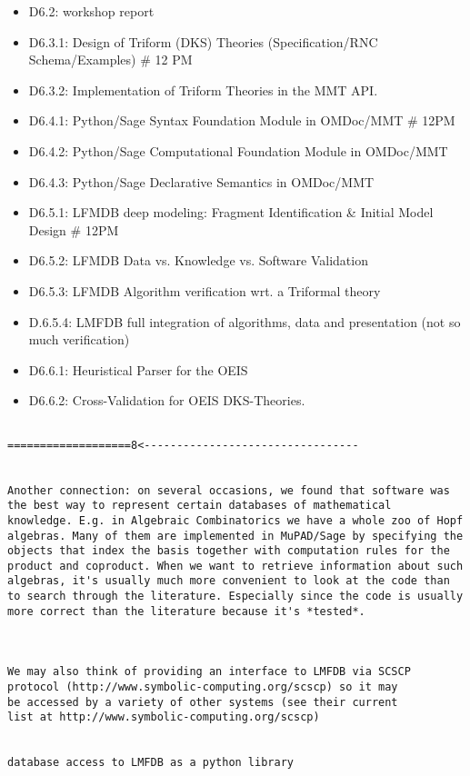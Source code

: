 \begin{Workpackage}{\thewpno}
\begin{WPDeliverables}
\begin{itemize}
\item D6.2: workshop report
\item D6.3.1: Design of Triform (DKS) Theories (Specification/RNC Schema/Examples)          # 12 PM
\item D6.3.2: Implementation of Triform Theories in the MMT API. 

\item D6.4.1: Python/Sage Syntax Foundation Module in OMDoc/MMT                                   # 12PM
\item D6.4.2: Python/Sage Computational Foundation Module in OMDoc/MMT
\item D6.4.3: Python/Sage Declarative Semantics in OMDoc/MMT

\item D6.5.1: LFMDB deep modeling: Fragment Identification & Initial Model Design              # 12PM
\item D6.5.2: LFMDB Data vs. Knowledge vs. Software Validation
\item D6.5.3: LFMDB Algorithm verification wrt. a Triformal theory
\item D.6.5.4: LMFDB full integration of algorithms, data and presentation (not so much verification)

\item D6.6.1: Heuristical Parser for the OEIS
\item D6.6.2: Cross-Validation for OEIS DKS-Theories.
\end{itemize}
\end{WPDeliverables}
\begin{verbatim}

===================8<---------------------------------


Another connection: on several occasions, we found that software was
the best way to represent certain databases of mathematical
knowledge. E.g. in Algebraic Combinatorics we have a whole zoo of Hopf
algebras. Many of them are implemented in MuPAD/Sage by specifying the
objects that index the basis together with computation rules for the
product and coproduct. When we want to retrieve information about such
algebras, it's usually much more convenient to look at the code than
to search through the literature. Especially since the code is usually
more correct than the literature because it's *tested*.



We may also think of providing an interface to LMFDB via SCSCP
protocol (http://www.symbolic-computing.org/scscp) so it may
be accessed by a variety of other systems (see their current
list at http://www.symbolic-computing.org/scscp)


database access to LMFDB as a python library


\end{verbatim}
\end{Workpackage}

